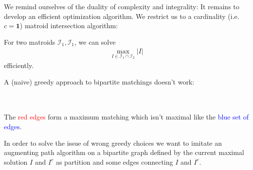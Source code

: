 We remind ourselves of the duality of complexity and integrality:
It remains to develop an efficient optimization algorithm.
We restrict us to a cardinality (i.e. $c = \mathbf{1}$) matroid intersection algorithm:
\begin{theorem}
    For two matroids $\mathcal I_1, \mathcal I_1$, we can solve
    \begin{align*}
        \max_{I \in \mathcal I_1 \cap \mathcal I_2}|I|
    \end{align*}
    efficiently.
\end{theorem}
\begin{observe}
    A (naive) greedy approach to bipartite matchings doesn't work:
    \\
    \\
    \begin{minipage}{\textwidth}
        \centering
    \end{minipage}
    \vspace{5pt}
    \\
    The \textcolor{red}{red edges} form a maximum matching which isn't maximal like the \textcolor{blue}{blue set of edges}.
\end{observe}
\begin{idea}
    In order to solve the issue of wrong greedy choices we want to imitate
    an augmenting path algorithm on a bipartite graph defined by the current maximal solution $I$ and $I^c$ as partition
    and some edges connecting $I$ and $I^c$.
\end{idea}
